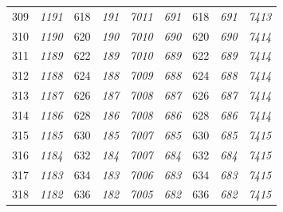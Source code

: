 \documentclass[10pt,fleqn]{article}
\begin{document}
\begin{longtable}{c|cccccccc}
309 & {\color{blue} \it 1191 \rm} & {\color{black} 618} & {\color{blue} \it 191 \rm} & {\color{blue} \it 7011 \rm} & {\color{blue} \it 691 \rm} & {\color{black} 618} & {\color{blue} \it 691 \rm} & {\color{blue} \it 7413 \rm} \\
310 & {\color{blue} \it 1190 \rm} & {\color{black} 620} & {\color{blue} \it 190 \rm} & {\color{blue} \it 7010 \rm} & {\color{blue} \it 690 \rm} & {\color{black} 620} & {\color{blue} \it 690 \rm} & {\color{blue} \it 7414 \rm} \\
311 & {\color{blue} \it 1189 \rm} & {\color{black} 622} & {\color{blue} \it 189 \rm} & {\color{blue} \it 7010 \rm} & {\color{blue} \it 689 \rm} & {\color{black} 622} & {\color{blue} \it 689 \rm} & {\color{blue} \it 7414 \rm} \\
312 & {\color{blue} \it 1188 \rm} & {\color{black} 624} & {\color{blue} \it 188 \rm} & {\color{blue} \it 7009 \rm} & {\color{blue} \it 688 \rm} & {\color{black} 624} & {\color{blue} \it 688 \rm} & {\color{blue} \it 7414 \rm} \\
313 & {\color{blue} \it 1187 \rm} & {\color{black} 626} & {\color{blue} \it 187 \rm} & {\color{blue} \it 7008 \rm} & {\color{blue} \it 687 \rm} & {\color{black} 626} & {\color{blue} \it 687 \rm} & {\color{blue} \it 7414 \rm} \\
314 & {\color{blue} \it 1186 \rm} & {\color{black} 628} & {\color{blue} \it 186 \rm} & {\color{blue} \it 7008 \rm} & {\color{blue} \it 686 \rm} & {\color{black} 628} & {\color{blue} \it 686 \rm} & {\color{blue} \it 7414 \rm} \\
315 & {\color{blue} \it 1185 \rm} & {\color{black} 630} & {\color{blue} \it 185 \rm} & {\color{blue} \it 7007 \rm} & {\color{blue} \it 685 \rm} & {\color{black} 630} & {\color{blue} \it 685 \rm} & {\color{blue} \it 7415 \rm} \\
316 & {\color{blue} \it 1184 \rm} & {\color{black} 632} & {\color{blue} \it 184 \rm} & {\color{blue} \it 7007 \rm} & {\color{blue} \it 684 \rm} & {\color{black} 632} & {\color{blue} \it 684 \rm} & {\color{blue} \it 7415 \rm} \\
317 & {\color{blue} \it 1183 \rm} & {\color{black} 634} & {\color{blue} \it 183 \rm} & {\color{blue} \it 7006 \rm} & {\color{blue} \it 683 \rm} & {\color{black} 634} & {\color{blue} \it 683 \rm} & {\color{blue} \it 7415 \rm} \\
318 & {\color{blue} \it 1182 \rm} & {\color{black} 636} & {\color{blue} \it 182 \rm} & {\color{blue} \it 7005 \rm} & {\color{blue} \it 682 \rm} & {\color{black} 636} & {\color{blue} \it 682 \rm} & {\color{blue} \it 7415 \rm} \\

\end{longtable}
\end{document}

